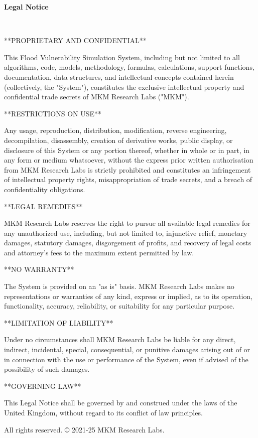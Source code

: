 \documentclass{article}
\begin{document}
\begin{center}
\large\textbf{Legal Notice}

\vspace{1em}
\
\noindent

**PROPRIETARY AND CONFIDENTIAL**

This Flood Vulnerability Simulation System, including but not limited to all algorithms, code, models, methodology, formulas, calculations, support functions, documentation, data structures, and intellectual concepts contained herein (collectively, the "System"), constitutes the exclusive intellectual property and confidential trade secrets of MKM Research Labs ("MKM").

**RESTRICTIONS ON USE**

Any usage, reproduction, distribution, modification, reverse engineering, decompilation, disassembly, creation of derivative works, public display, or disclosure of this System or any portion thereof, whether in whole or in part, in any form or medium whatsoever, without the express prior written authorisation from MKM Research Labs is strictly prohibited and constitutes an infringement of intellectual property rights, misappropriation of trade secrets, and a breach of confidentiality obligations.

**LEGAL REMEDIES**

MKM Research Labs reserves the right to pursue all available legal remedies for any unauthorized use, including, but not limited to, injunctive relief, monetary damages, statutory damages, disgorgement of profits, and recovery of legal costs and attorney's fees to the maximum extent permitted by law.

**NO WARRANTY**

The System is provided on an "as is" basis. MKM Research Labs makes no representations or warranties of any kind, express or implied, as to its operation, functionality, accuracy, reliability, or suitability for any particular purpose.

**LIMITATION OF LIABILITY**

Under no circumstances shall MKM Research Labs be liable for any direct, indirect, incidental, special, consequential, or punitive damages arising out of or in connection with the use or performance of the System, even if advised of the possibility of such damages.

**GOVERNING LAW**

This Legal Notice shall be governed by and construed under the laws of the United Kingdom, without regard to its conflict of law principles.


\vspace{1em}

\noindent All rights reserved. © 2021-25 MKM Research Labs.

\vspace{2em}
\end{center}
\clearpage
\end{document}
